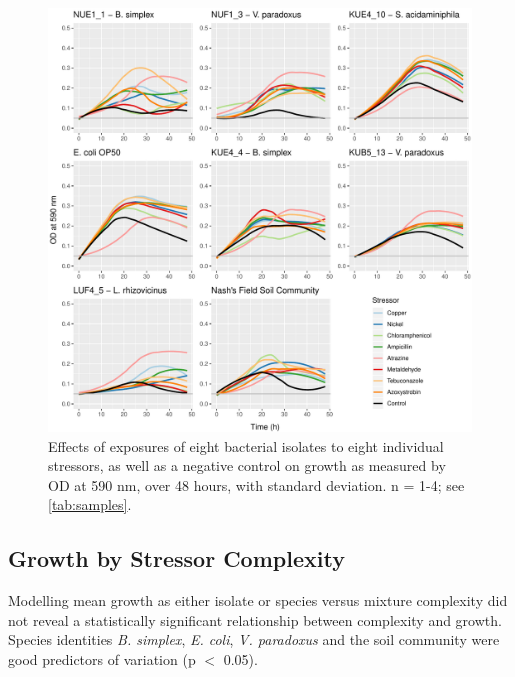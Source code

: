 \documentclass[final,1p,times]{elsarticle}
\begin{document}
\begin{figure}[H]
    \centering
    \includegraphics[width = \textwidth]{Scripts/Results/Final_Pipeline/single_stressor_plots.pdf}
    \caption{Effects of exposures of eight bacterial isolates to eight individual stressors, as well as a negative control on growth as measured by OD at 590 nm, over 48 hours, with standard deviation. n = 1-4; see \cref{tab:samples}.}
    \label{fig:sstress}
\end{figure}

\newpage
\subsection{Growth by Stressor Complexity}
\label{S:3:4}

Modelling mean growth as either isolate or species versus mixture complexity did not reveal a statistically significant relationship between complexity and growth. Species identities \textit{B. simplex}, \textit{E. coli}, \textit{V. paradoxus} and the soil community were good predictors of variation (p $<$ 0.05).
\end{document}
